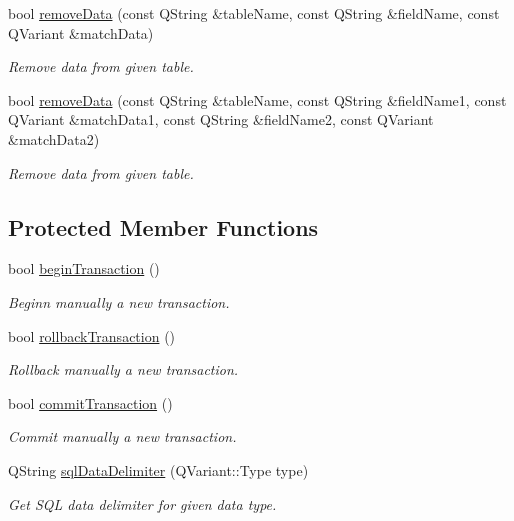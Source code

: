 \begin{DoxyCompactItemize}
bool \hyperlink{classmdt_tt_base_aefe84f30c646a4f53b42fcc102a1126d}{remove\-Data} (const Q\-String \&table\-Name, const Q\-String \&field\-Name, const Q\-Variant \&match\-Data)
\begin{DoxyCompactList}\small\item\em Remove data from given table. \end{DoxyCompactList}\item 
bool \hyperlink{classmdt_tt_base_ae301ec4f49781e9b649a1e49368838a5}{remove\-Data} (const Q\-String \&table\-Name, const Q\-String \&field\-Name1, const Q\-Variant \&match\-Data1, const Q\-String \&field\-Name2, const Q\-Variant \&match\-Data2)
\begin{DoxyCompactList}\small\item\em Remove data from given table. \end{DoxyCompactList}\end{DoxyCompactItemize}
\subsection*{Protected Member Functions}
\begin{DoxyCompactItemize}
\item 
bool \hyperlink{classmdt_tt_base_a733fc8720c9eeabd3395883ba5a544ce}{begin\-Transaction} ()
\begin{DoxyCompactList}\small\item\em Beginn manually a new transaction. \end{DoxyCompactList}\item 
bool \hyperlink{classmdt_tt_base_a7c736836397a8d65a28992e1a39c1be5}{rollback\-Transaction} ()
\begin{DoxyCompactList}\small\item\em Rollback manually a new transaction. \end{DoxyCompactList}\item 
bool \hyperlink{classmdt_tt_base_a32b6cbd2d6c9a055cbc97136e9958d81}{commit\-Transaction} ()
\begin{DoxyCompactList}\small\item\em Commit manually a new transaction. \end{DoxyCompactList}\item 
Q\-String \hyperlink{classmdt_tt_base_ad6eed5cb4ab7403ce257a4bd6e0428c8}{sql\-Data\-Delimiter} (Q\-Variant\-::\-Type type)
\begin{DoxyCompactList}\small\item\em Get S\-Q\-L data delimiter for given data type. \end{DoxyCompactList}\end{DoxyCompactItemize}
